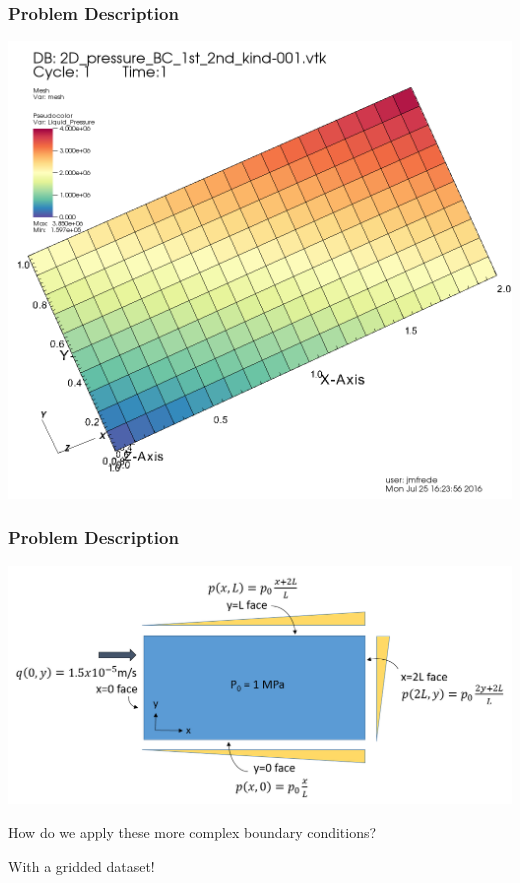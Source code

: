 \documentclass{beamer}
\begin{document}
\begin{frame}\frametitle{Problem Description}

\includegraphics[width=0.75\textheight]{./visit_figure.png}

\end{frame}

\begin{frame}\frametitle{Problem Description}

\includegraphics[width=1.2\textheight]{./BC_schematic.png}

How do we apply these more complex boundary conditions? 

With a gridded dataset!

\end{frame}
\end{document}
